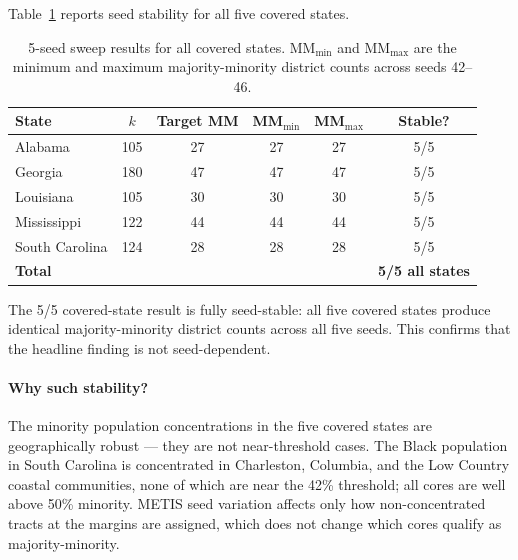Table~\ref{tab:all-seeds} reports seed stability for all five covered states.

\begin{table}[h]
\centering
\caption{5-seed sweep results for all covered states. MM$_{\min}$ and MM$_{\max}$ are the minimum and maximum majority-minority district counts across seeds 42--46.}
\label{tab:all-seeds}
\begin{tabular}{lccccc}
\toprule
State & $k$ & Target MM & MM$_{\min}$ & MM$_{\max}$ & Stable? \\
\midrule
Alabama       & 105 & 27 & 27 & 27 & 5/5 \\
Georgia       & 180 & 47 & 47 & 47 & 5/5 \\
Louisiana     & 105 & 30 & 30 & 30 & 5/5 \\
Mississippi   & 122 & 44 & 44 & 44 & 5/5 \\
South Carolina & 124 & 28 & 28 & 28 & 5/5 \\
\midrule
\textbf{Total} & & & & & \textbf{5/5 all states} \\
\bottomrule
\end{tabular}
\end{table}

The 5/5 covered-state result is fully seed-stable: all five covered states produce identical majority-minority district counts across all five seeds. This confirms that the headline finding is not seed-dependent.

\paragraph{Why such stability?}
The minority population concentrations in the five covered states are geographically robust --- they are not near-threshold cases. The Black population in South Carolina is concentrated in Charleston, Columbia, and the Low Country coastal communities, none of which are near the 42\% threshold; all cores are well above 50\% minority. METIS seed variation affects only how non-concentrated tracts at the margins are assigned, which does not change which cores qualify as majority-minority.
